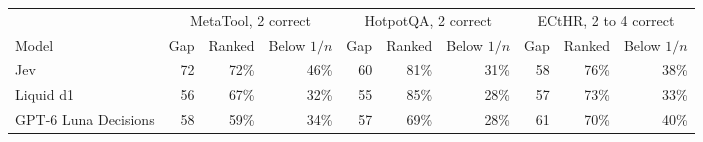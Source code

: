 \begin{tabular}{lrrrrrrrrr}
\toprule
 & \multicolumn{3}{c}{MetaTool, 2 correct} & \multicolumn{3}{c}{HotpotQA, 2 correct} & \multicolumn{3}{c}{ECtHR, 2 to 4 correct} \\
\cmidrule(lr){2-4} \cmidrule(lr){5-7} \cmidrule(lr){8-10}
Model & Gap & Ranked & Below $1/n$ & Gap & Ranked & Below $1/n$ & Gap & Ranked & Below $1/n$ \\
\midrule
Jev & 72 & 72\% & 46\% & 60 & 81\% & 31\% & 58 & 76\% & 38\% \\
Liquid d1 & 56 & 67\% & 32\% & 55 & 85\% & 28\% & 57 & 73\% & 33\% \\
GPT-6 Luna Decisions & 58 & 59\% & 34\% & 57 & 69\% & 28\% & 61 & 70\% & 40\% \\
\bottomrule
\end{tabular}

